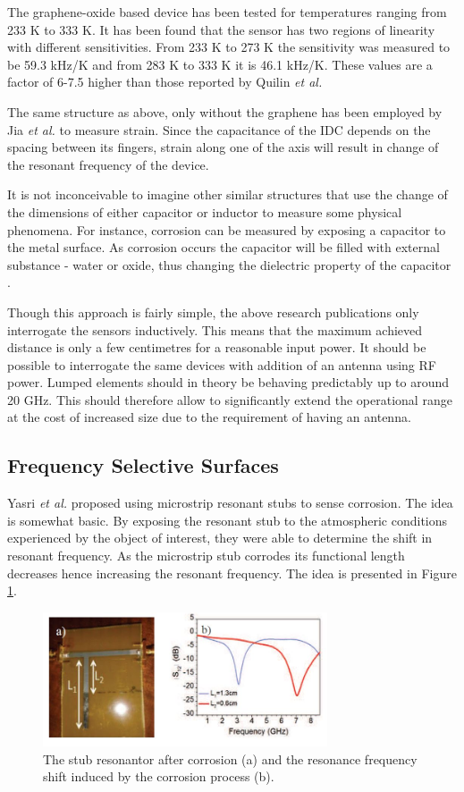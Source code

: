 \documentclass[11pt,a4paper]{article}
\begin{document}
The graphene-oxide based device has been tested for temperatures ranging from 233 K to 333 K. It has been found that the sensor has two regions of linearity with different sensitivities. From 233 K to 273 K the sensitivity was measured to be 59.3 kHz/K and from 283 K to 333 K it is 46.1 kHz/K. These values are a factor of 6-7.5 higher than those reported by Quilin \textit{et al.}

The same structure as above, only without the graphene  has been employed by Jia \textit{et al.} \cite{IDC} to measure strain. Since the capacitance of the IDC depends on the spacing between its fingers, strain along one of the axis will result in change of the resonant frequency of the device. 

It is not inconceivable to imagine other similar structures that use the change of the dimensions of either capacitor or inductor to measure some physical phenomena. For instance, corrosion can be measured by exposing a capacitor to the metal surface. As corrosion occurs the capacitor will be filled with external substance - water or oxide, thus changing the dielectric property of the capacitor \cite{corrosion}.

Though this approach is fairly simple, the above research publications only interrogate the sensors inductively. This means that the maximum achieved distance is only a few centimetres for a reasonable input power. It should be possible to interrogate the same devices with addition of an antenna using RF power. Lumped elements should in theory be behaving predictably up to around 20 GHz. This should therefore allow to significantly extend the operational range at the cost of increased size due to the requirement of having an antenna.

\subsection{Frequency Selective Surfaces}

Yasri \textit{et al.} \cite{corrosion2} proposed using microstrip resonant stubs to sense corrosion. The idea is somewhat basic. By exposing the resonant stub to the atmospheric conditions experienced by the object of interest, they were able to determine the shift in resonant frequency. As the microstrip stub corrodes its functional length decreases hence increasing the resonant frequency. The idea is presented in Figure \ref{fig:stub}.

\begin{figure}[h]
\centering
\includegraphics[width=0.75\textwidth]{stub.JPG}
\caption{The stub resonantor after corrosion (a) and the resonance frequency shift induced by the corrosion process (b).\cite{corrosion2}\label{fig:stub}}
\end{figure}
\end{document}
